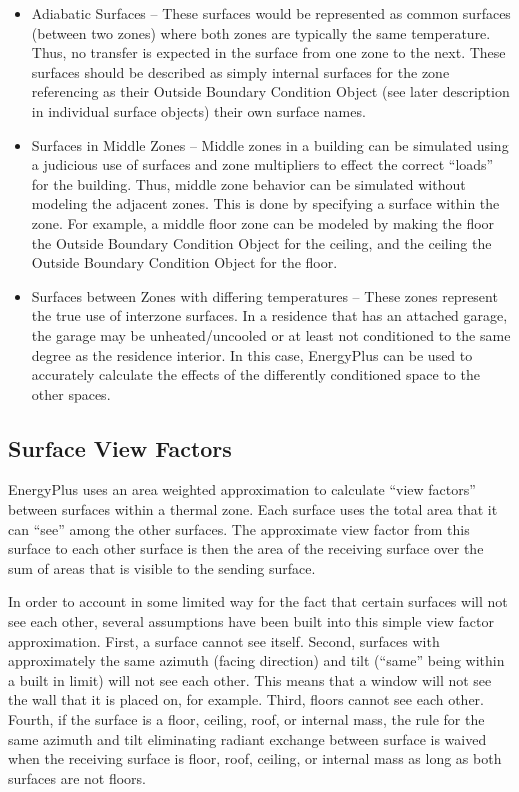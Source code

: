 \begin{itemize}
\item
  Adiabatic Surfaces -- These surfaces would be represented as common surfaces (between two zones) where both zones are typically the same temperature. Thus, no transfer is expected in the surface from one zone to the next. These surfaces should be described as simply internal surfaces for the zone referencing as their Outside Boundary Condition Object (see later description in individual surface objects) their own surface names.
\item
  Surfaces in Middle Zones -- Middle zones in a building can be simulated using a judicious use of surfaces and zone multipliers to effect the correct ``loads'' for the building. Thus, middle zone behavior can be simulated without modeling the adjacent zones. This is done by specifying a surface within the zone. For example, a middle floor zone can be modeled by making the floor the Outside Boundary Condition Object for the ceiling, and the ceiling the Outside Boundary Condition Object for the floor.
\item
  Surfaces between Zones with differing temperatures -- These zones represent the true use of interzone surfaces. In a residence that has an attached garage, the garage may be unheated/uncooled or at least not conditioned to the same degree as the residence interior. In this case, EnergyPlus can be used to accurately calculate the effects of the differently conditioned space to the other spaces.
\end{itemize}

\subsection{Surface View Factors}\label{surface-view-factors}

EnergyPlus uses an area weighted approximation to calculate ``view factors'' between surfaces within a thermal zone. Each surface uses the total area that it can ``see'' among the other surfaces. The approximate view factor from this surface to each other surface is then the area of the receiving surface over the sum of areas that is visible to the sending surface.

In order to account in some limited way for the fact that certain surfaces will not see each other, several assumptions have been built into this simple view factor approximation. First, a surface cannot see itself. Second, surfaces with approximately the same azimuth (facing direction) and tilt (``same'' being within a built in limit) will not see each other. This means that a window will not see the wall that it is placed on, for example. Third, floors cannot see each other. Fourth, if the surface is a floor, ceiling, roof, or internal mass, the rule for the same azimuth and tilt eliminating radiant exchange between surface is waived when the receiving surface is floor, roof, ceiling, or internal mass as long as both surfaces are not floors.


